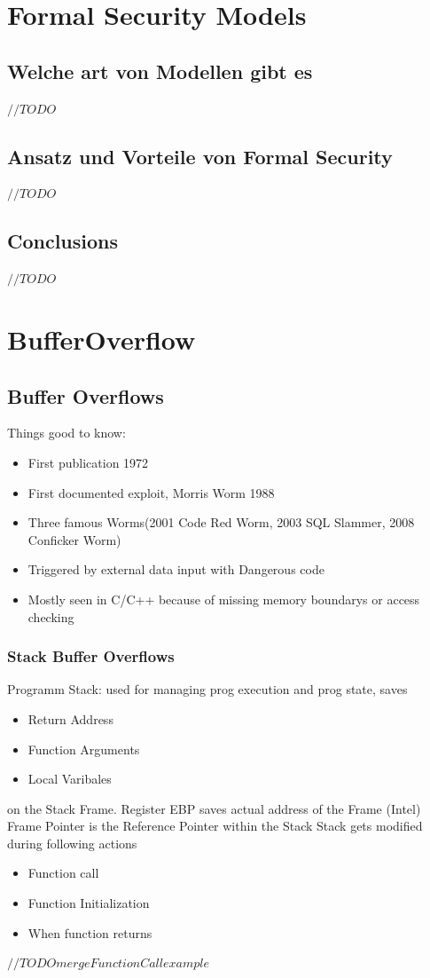 \documentclass[a4paper, 12pt]{article}
\begin{document}
\section{Formal Security Models}
\subsection{Welche art von Modellen gibt es}
$ //TODO $
\subsection{Ansatz und Vorteile von Formal Security}
$ //TODO $
\subsection{Conclusions}
$ //TODO $

\section{BufferOverflow}
\subsection{Buffer Overflows}
Things good to know:
\begin{itemize}
\item First publication 1972
\item First documented exploit, Morris Worm 1988
\item Three famous Worms(2001 Code Red Worm, 2003 SQL Slammer, 2008 Conficker Worm)
\item Triggered by external data input with Dangerous code
\item Mostly seen in C/C++ because of missing memory boundarys or access checking
\end{itemize}
\subsubsection{Stack Buffer Overflows}
Programm Stack: used for managing prog execution and prog state, saves 
\begin{itemize}
\item Return Address
\item Function Arguments
\item Local Varibales
\end{itemize}
on the Stack Frame.
Register EBP saves actual address of the Frame (Intel)
Frame Pointer is the Reference Pointer within the Stack
Stack gets modified during following actions
\begin{itemize}
\item Function call
\item Function Initialization
\item When function returns
\end{itemize}
$ //TODO merge FunctionCall example $
\end{document}
